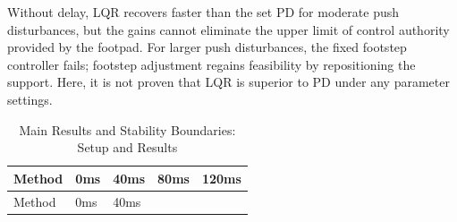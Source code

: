 Without delay, LQR recovers faster than the set PD for moderate push disturbances, but the gains cannot eliminate the upper limit of control authority provided by the footpad. For larger push disturbances, the fixed footstep controller fails; footstep adjustment regains feasibility by repositioning the support. Here, it is not proven that LQR is superior to PD under any parameter settings.


\FloatBarrier\begingroup\small\setlength{\tabcolsep}{2.5pt}
\begin{longtable}[]{@{}
  >{\raggedright\arraybackslash}p{}
  >{\raggedright\arraybackslash}p{}
  >{\raggedright\arraybackslash}p{}
  >{\raggedright\arraybackslash}p{}
  >{\raggedright\arraybackslash}p{}@{}}
\caption{Main Results and Stability Boundaries: Setup and Results}\label{tab:s18-4}\tabularnewline
\toprule\noalign{}
\begin{minipage}[b]{\linewidth}\raggedright
Method
\end{minipage} & \begin{minipage}[b]{\linewidth}\raggedright
0ms
\end{minipage} & \begin{minipage}[b]{\linewidth}\raggedright
40ms
\end{minipage} & \begin{minipage}[b]{\linewidth}\raggedright
80ms
\end{minipage} & \begin{minipage}[b]{\linewidth}\raggedright
120ms
\end{minipage} \\
\midrule\noalign{}
\endfirsthead
\toprule\noalign{}
\begin{minipage}[b]{\linewidth}\raggedright
Method
\end{minipage} & \begin{minipage}[b]{\linewidth}\raggedright
0ms
\end{minipage} & \begin{minipage}[b]{\linewidth}\raggedright
40ms
\end{minipage} & \begin{minipage}[b]{\linewidth}\raggedright

\end{minipage}
\end{longtable}
